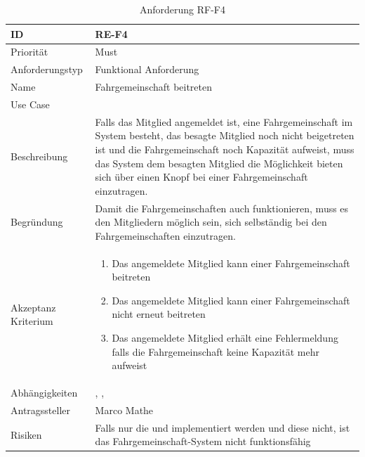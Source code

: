 \begin{table}[ht]
\centering
  \begin{tabular}{ l | p{8cm} }
	\hline
	\rowcolor{gray}
	ID 			&	\textbf{RE-F4}\\ \hline
	Priorität 		&	Must\\ \hline
	Anforderungstyp	&	Funktional Anforderung\\ \hline
	Name 			&	Fahrgemeinschaft beitreten\\ \hline
	Use Case 		&	\nameref{table:use_case_3}\\ \hline
	Beschreibung 	&	Falls das Mitglied angemeldet ist, eine Fahrgemeinschaft im System besteht, das besagte Mitglied noch nicht beigetreten ist und die Fahrgemeinschaft noch Kapazität aufweist, muss das System dem besagten Mitglied die Möglichkeit bieten sich über einen Knopf bei einer Fahrgemeinschaft einzutragen.\\ \hline
	Begründung 		&	Damit die Fahrgemeinschaften auch funktionieren, muss es den Mitgliedern möglich sein, sich selbständig bei den Fahrgemeinschaften einzutragen.\\ \hline
	Akzeptanz Kriterium	&	\begin{enumerate}
					\item Das angemeldete Mitglied kann einer Fahrgemeinschaft beitreten
					\item Das angemeldete Mitglied kann einer Fahrgemeinschaft nicht erneut beitreten
					\item Das angemeldete Mitglied erhält eine Fehlermeldung falls die Fahrgemeinschaft keine Kapazität mehr aufweist
					\end{enumerate}
					\\ \hline
	Abhängigkeiten 	&	\nameref{table:req_1}, \nameref{table:req_2}, \nameref{table:req_3}\\ \hline
	Antragssteller 	&	Marco Mathe\\ \hline
	Risiken	 	&	Falls nur die \nameref{table:req_2} und \nameref{table:req_3} implementiert werden und diese nicht, ist das Fahrgemeinschaft-System nicht funktionsfähig
  \end{tabular}
   \caption{Anforderung RF-F4}\label{table:req_4}
\end{table}

